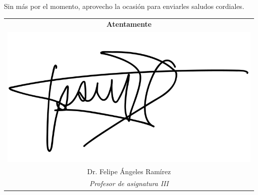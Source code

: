 \begin{large}
\bigskip

Sin más por el momento, aprovecho la ocasión para enviarles saludos cordiales.

\vspace{0.2cm}
\begin{flushright}
	\begin{tabular}{ c }
		\textbf{Atentamente}\\
		\includegraphics[scale=0.2]{img/felipeFirma} \\
		Dr. Felipe Ángeles Ramírez \\
		\textit{Profesor de asignatura III} \\
	\end{tabular}
\end{flushright}

\vspace{0.3cm}

\end{large}

